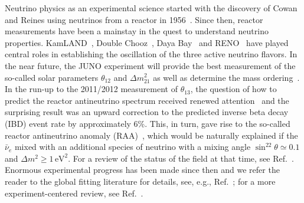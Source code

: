 \documentclass[prd, twocolumn, tightenlines, twoside, secnumarabic, superscriptaddress, preprintnumbers, nofootinbib, notitlepage]{revtex4-1}
\begin{document}
Neutrino physics as an experimental science started with the discovery of Cowan and Reines using neutrinos from a reactor in 1956~\cite{Cowan:1992xc}. Since then, reactor measurements have been a mainstay in the quest to understand neutrino properties. KamLAND~\cite{Eguchi:2002dm}, Double Chooz~\cite{Abe:2011fz}, Daya Bay~\cite{An:2012eh} and RENO~\cite{Ahn:2012nd} have played central roles in establishing the oscillation of the three active neutrino flavors. In the near future, the JUNO experiment will provide the best measurement of the so-called solar parameters $\theta_{12}$ and $\Delta m^2_{21}$ as well as determine the mass ordering~\cite{An:2015jdp}. In the run-up to the 2011/2012 measurement of $\theta_{13}$, the question of how to predict the reactor antineutrino spectrum received renewed attention~\cite{Mueller:2011nm,Huber:2011wv} and the surprising result was an upward correction to the predicted inverse beta decay (IBD) event rate by approximately 6\%. This, in turn, gave rise to the so-called reactor antineutrino anomaly (RAA)~\cite{Mention:2011rk}, which would be naturally explained if the $\bar\nu_e$ mixed with an additional species of neutrino with a mixing angle $\sin^22\theta\simeq0.1$ and $\Delta m^2\geq 1\,\mathrm{eV}^2$. For a review of the status of the field at that time, see Ref.~\cite{Abazajian:2012ys}. Enormous experimental progress has been made since then and  we refer the reader to the global fitting literature for details, see, e.g., Ref.~\cite{Giunti:2017yid, Dentler:2017tkw, Dentler:2018sju, Giunti:2019qlt, Berryman:2020agd,Giunti:2020uhv, Giunti:2021kab}; for a more experiment-centered review, see Ref.~\cite{Boser:2019rta}.
\end{document}
